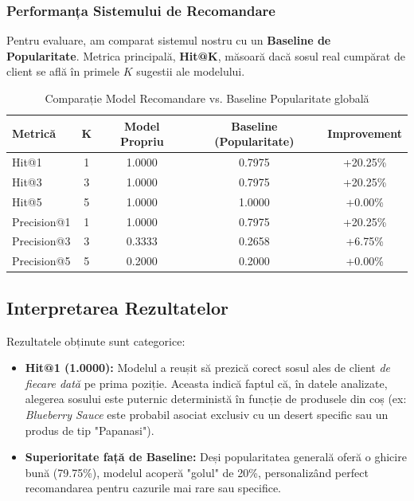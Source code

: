 \documentclass[12pt,a4paper]{article}
\begin{document}
\subsubsection*{Performanța Sistemului de Recomandare}

Pentru evaluare, am comparat sistemul nostru cu un \textbf{Baseline de Popularitate}. Metrica principală, \textbf{Hit@K}, măsoară dacă sosul real cumpărat de client se află în primele $K$ sugestii ale modelului.

\begin{table}[h]
    \centering
    \caption{Comparație Model Recomandare vs. Baseline Popularitate globală}
    \vspace{0.2cm}
    \begin{tabular}{lcccc}
        \toprule
        \textbf{Metrică} & \textbf{K} & \textbf{Model Propriu} & \textbf{Baseline (Popularitate)} & \textbf{Improvement} \\
        \midrule
        Hit@1 & 1 & 1.0000 & 0.7975 & +20.25\%\\
        Hit@3 & 3 & 1.0000 & 0.7975 & +20.25\% \\
        Hit@5 & 5 & 1.0000 & 1.0000 & +0.00\% \\
        \midrule
        Precision@1 & 1 & 1.0000 & 0.7975 & +20.25\% \\
        Precision@3 & 3 & 0.3333 & 0.2658 & +6.75\% \\
        Precision@5 & 5 & 0.2000 & 0.2000 & +0.00\% \\
        \bottomrule
    \end{tabular}
\end{table}

\subsection{Interpretarea Rezultatelor}

Rezultatele obținute sunt categorice:
\begin{itemize}
    \item \textbf{Hit@1 (1.0000):} Modelul a reușit să prezică corect sosul ales de client \textit{de fiecare dată} pe prima poziție. Aceasta indică faptul că, în datele analizate, alegerea sosului este puternic deterministă în funcție de produsele din coș (ex: \textit{Blueberry Sauce} este probabil asociat exclusiv cu un desert specific sau un produs de tip "Papanasi").
    \item \textbf{Superioritate față de Baseline:} Deși popularitatea generală oferă o ghicire bună (79.75\%), modelul acoperă "golul" de 20\%, personalizând perfect recomandarea pentru cazurile mai rare sau specifice.
\end{itemize}
\end{document}
